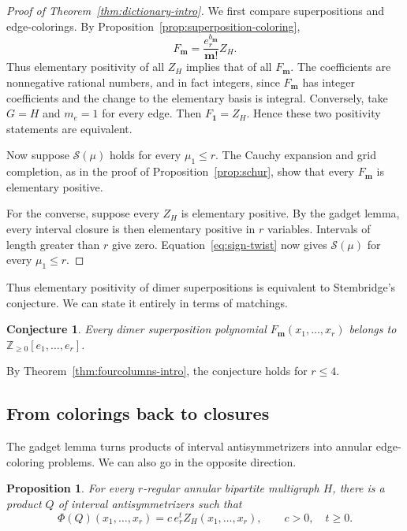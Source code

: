 \documentclass[11pt]{article}
\newtheorem{proposition}[theorem]{Proposition}
\newtheorem{conjecture}[theorem]{Conjecture}
\theoremstyle{definition}
\theoremstyle{remark}
\newcommand{\NN}{\mathbb Z_{\ge0}}
\newcommand{\mm}{\mathbf m}
\begin{document}
\begin{proof}[Proof of Theorem~\ref{thm:dictionary-intro}]
We first compare superpositions and edge-colorings.
By Proposition~\ref{prop:superposition-coloring},
\[
F_{\mm}=\frac{e_r^{b_{\mm}}}{\mm!}Z_H.
\]
Thus elementary positivity of all $Z_H$ implies
that of all $F_{\mm}$. The coefficients are
nonnegative rational numbers, and in fact integers,
since $F_{\mm}$ has integer coefficients and the
change to the elementary basis is integral.
Conversely, take $G=H$ and $m_e=1$ for every edge.
Then $F_{\mathbf1}=Z_H$. Hence these two
positivity statements are equivalent.

Now suppose $\mathcal S(\mu)$ holds for every
$\mu_1\le r$. The Cauchy expansion and grid
completion, as in the proof of
Proposition~\ref{prop:schur}, show that every
$F_{\mm}$ is elementary positive.

For the converse, suppose every $Z_H$ is
elementary positive. By the gadget lemma,
every interval closure is then elementary
positive in $r$ variables. Intervals of
length greater than $r$ give zero.
Equation~\eqref{eq:sign-twist} now gives
$\mathcal S(\mu)$ for every $\mu_1\le r$.
\end{proof}

Thus elementary positivity of dimer superpositions
is equivalent to Stembridge's conjecture. We can
state it entirely in terms of matchings.

\begin{conjecture}
\label{conj:epositive}
Every dimer superposition polynomial
$F_{\mm}(x_1,\ldots,x_r)$ belongs to
$\NN[e_1,\ldots,e_r]$.
\end{conjecture}

By Theorem~\ref{thm:fourcolumns-intro},
the conjecture holds for $r\le4$.


\subsection{From colorings back to closures}

The gadget lemma turns products of interval
antisymmetrizers into annular edge-coloring problems.
We can also go in the opposite direction.

\begin{proposition}\label{prop:grid-closure}
For every $r$-regular annular bipartite multigraph
$H$, there is a product $Q$ of interval
antisymmetrizers such that
\[
\Phi(Q)(x_1,\ldots,x_r)
=c\,e_r^t Z_H(x_1,\ldots,x_r),
\qquad c>0,\quad t\ge0.
\]
\end{proposition}
\end{document}
